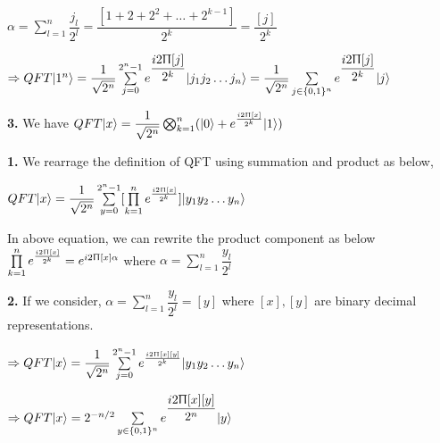 \documentclass [12pt]{article}
\theoremstyle{definition}
\newcommand{\ket}[1]{| {#1} \rangle}
\newcommand{\suml}[2]{\sum\limits_{#1}^{#2}}
\begin{document}
\phantom{1000em} $\alpha = \suml{l=1}{n} \dfrac{j_{l}}{2^{l}} = \dfrac{[1 + 2 + 2^{2} + \dots + 2^{k-1}]}{2^{k}} = \dfrac{[j]}{2^{k}}$

\phantom{1000em} $\Rightarrow QFT\ket{1^{n}} = \dfrac{1}{\sqrt{2^{n}}} \suml{j=0}{2^{n} - 1} e^{\dfrac{i2\Uppi [j]}{2^{k}}} \ket{j_{1} j_{2} \dots j_{n}} = \dfrac{1}{\sqrt{2^{n}}} \suml{j \in \{0,1\}^{n}}{ } e^{\dfrac{i2\Uppi [j]}{2^{k}}} \ket{j}$

{\bf 3.} We have $QFT\ket{x} = \dfrac{1}{\sqrt{2^{n}}} \bigotimes_{k=1}^{n}(\ket{0} + e^{\frac{i2\Uppi [x]}{2^{k}}}\ket{1})$

\phantom{1em} {\bf 1.} We rearrage the definition of QFT using summation and product as below,

\phantom{1000em} $QFT\ket{x} = \dfrac{1}{\sqrt{2^{n}}} \suml{y=0}{2^{n} - 1}[ \prod\limits_{k=1}^{n} e^{\frac{i2\Uppi [x]}{2^{k}}}] \ket{y_{1} y_{2} \dots y_{n}}$

\phantom{1000em} In above equation, we can rewrite the product component as below \\
\phantom{1000em} $\prod\limits_{k=1}^{n} e^{\frac{i2\Uppi [x]}{2^{k}}} = e^{i2\Uppi [x] \alpha}$ where $\alpha = \suml{l=1}{n} \dfrac{y_{l}}{2^{l}}$

\phantom{1em} {\bf 2.} If we consider, $\alpha = \suml{l=1}{n} \dfrac{y_{l}}{2^{l}} = [y]$ where $[x],[y]$ are binary decimal representations. 

\phantom{1000em} $\Rightarrow QFT\ket{x} = \dfrac{1}{\sqrt{2^{n}}} \suml{j=0}{2^{n} - 1} e^{\frac{i2\Uppi [x][y]}{2^{k}}} \ket{y_{1} y_{2} \dots y_{n}}$
 
\phantom{1000em} $\Rightarrow QFT\ket{x} = 2^{-n/2} \suml{y \in \{0,1\}^{n}}{ } e^{\dfrac{i2\Uppi [x][y]}{2^{n}}} \ket{y}$
 
\newpage
 
\end{document}
